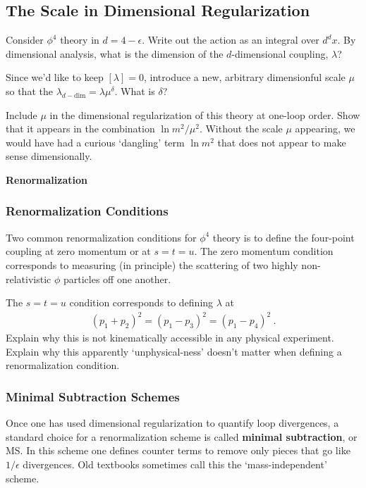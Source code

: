 \documentclass[12pt]{article}
\numberwithin{equation}{subsection}    %
\begin{document}
{\subsection{The Scale in Dimensional Regularization}

Consider $\phi^4$ theory in $d=4-\epsilon$. Write out the action as an integral over $d^dx$. By dimensional analysis, what is the dimension of the $d$-dimensional coupling, $\lambda$? 

Since we'd like to keep $[\lambda] = 0$, introduce a new, arbitrary dimensionful scale $\mu$ so that the $\lambda_{d-\text{dim}} = \lambda \mu^\delta$. What is $\delta$?

Include $\mu$ in the dimensional regularization of this theory at one-loop order. Show that it appears in the combination $\ln m^2/\mu^2$. Without the scale $\mu$ appearing, we would have had a curious `dangling' term $\ln m^2$ that does not appear to make sense dimensionally.


\vspace{1em}
{\Large \bf \sffamily Renormalization}

\subsubsection{Renormalization Conditions}

Two common renormalization conditions for $\phi^4$ theory is to define the four-point coupling at zero momentum or at $s=t=u$. The zero momentum condition corresponds to measuring (in principle) the scattering of two highly non-relativistic $\phi$ particles off one another. 

The $s=t=u$ condition corresponds to defining $\lambda$ at
\begin{align}
	(p_1+p_2)^2 = (p_1 - p_3)^2 = (p_1 - p_4)^2 \ .
\end{align}
Explain why this is not kinematically accessible in any physical experiment. Explain why this apparently `unphysical-ness' doesn't matter when defining a renormalization condition. 



\subsubsection{Minimal Subtraction Schemes}

Once one has used dimensional regularization to quantify loop divergences, a standard choice for a renormalization scheme is called \textbf{minimal subtraction}, or MS. In this scheme one defines counter terms to remove only pieces that go like $1/\epsilon$ divergences. Old textbooks sometimes call this the `mass-independent' scheme.

}
\end{document}
